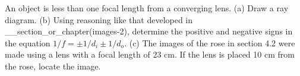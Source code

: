 \answercheck An object is less than one focal length from a
converging lens. (a) Draw a ray diagram. (b) Using reasoning
like that developed in __section_or_chapter(images-2), determine the
positive and negative signs in the equation $1/f=\pm1/d_i\pm1/d_o$. (c) The images
of the rose in section 4.2 were made using a lens with a
focal length of 23 cm. If the lens is placed 10 cm from the
rose, locate the image.
